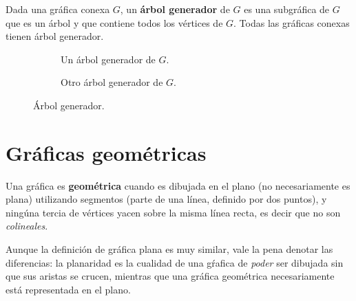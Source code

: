 \begin{definition}
Dada una gr\'afica conexa $G$, un \textbf{\'arbol generador} de $G$ es una subgr\'afica de $G$ que es un \'arbol y que contiene todos los v\'ertices de $G$. Todas las gr\'aficas conexas tienen \'arbol generador.
\end{definition}

\begin{figure}
\centering
  \begin{subfigure}{0.4\textwidth}
    \caption{Un \'arbol generador de $G$.}\label{fig:graph}
  \end{subfigure}
  \begin{subfigure}{0.4\textwidth}
    \caption{Otro \'arbol generador de $G$.}
  \end{subfigure}
  \caption{\'Arbol generador.}
\end{figure}

\section{Gr\'aficas geom\'etricas}

\begin{definition}
Una gr\'afica es \textbf{geom\'etrica} cuando es dibujada en el plano (no necesariamente es plana) utilizando segmentos (parte de una l\'inea, definido por dos puntos), y ning\'una tercia de v\'ertices yacen sobre la misma l\'inea recta, es decir que no son \emph{colineales}. \cite{handbook}
\end{definition}

Aunque la definición de gráfica plana es muy similar, vale la pena denotar las diferencias: la planaridad es la cualidad de una gŕafica de \textit{poder} ser dibujada sin que sus aristas se crucen, mientras que una gráfica geométrica necesariamente está representada en el plano.

